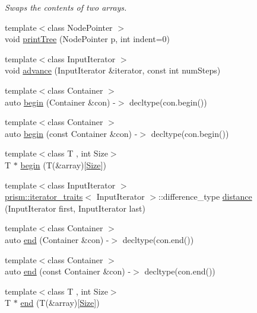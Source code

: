 \begin{DoxyCompactItemize}
\begin{DoxyCompactList}\small\item\em Swaps the contents of two arrays. \end{DoxyCompactList}\item 
{\footnotesize template$<$class Node\+Pointer $>$ }\\void \hyperlink{namespaceprism_a3ec96a679831176af1c6f2b7480226e1}{print\+Tree} (Node\+Pointer p, int indent=0)
\item 
{\footnotesize template$<$class Input\+Iterator $>$ }\\void \hyperlink{namespaceprism_a667eee76b54258f4f3530eaa7ef44d69}{advance} (Input\+Iterator \&iterator, const int num\+Steps)
\item 
{\footnotesize template$<$class Container $>$ }\\auto \hyperlink{namespaceprism_a6d7a987672303bcc2aad6eedfa3c97c5}{begin} (Container \&con) -\/$>$ decltype(con.\+begin())
\item 
{\footnotesize template$<$class Container $>$ }\\auto \hyperlink{namespaceprism_a1d797e0ebd535413f23ff6c378bce541}{begin} (const Container \&con) -\/$>$ decltype(con.\+begin())
\item 
{\footnotesize template$<$class T , int Size$>$ }\\T $\ast$ \hyperlink{namespaceprism_a1fa3ae5087a69ca4b87cd0142dd7f4f4}{begin} (T(\&array)\mbox{[}\hyperlink{classprism_1_1_size}{Size}\mbox{]})
\item 
{\footnotesize template$<$class Input\+Iterator $>$ }\\\hyperlink{structprism_1_1iterator__traits}{prism\+::iterator\+\_\+traits}$<$ Input\+Iterator $>$\+::difference\+\_\+type \hyperlink{namespaceprism_ad9a8b01383d77bc9bcd878901af6f8bb}{distance} (Input\+Iterator first, Input\+Iterator last)
\item 
{\footnotesize template$<$class Container $>$ }\\auto \hyperlink{namespaceprism_acd1f6ce5ed6fe400694b77f49270ea36}{end} (Container \&con) -\/$>$ decltype(con.\+end())
\item 
{\footnotesize template$<$class Container $>$ }\\auto \hyperlink{namespaceprism_a81b99f9ade4f7bd30ab1c5a64a20d539}{end} (const Container \&con) -\/$>$ decltype(con.\+end())
\item 
{\footnotesize template$<$class T , int Size$>$ }\\T $\ast$ \hyperlink{namespaceprism_a9b7ee229aa856b527057b2abdf6cf144}{end} (T(\&array)\mbox{[}\hyperlink{classprism_1_1_size}{Size}\mbox{]})

\end{DoxyCompactItemize}
